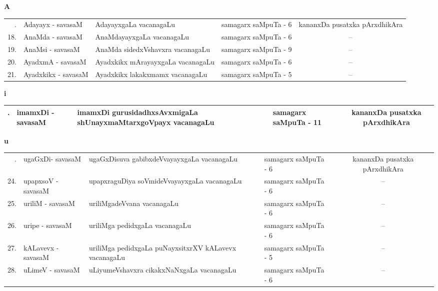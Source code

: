 \centerline{\bf A}

\medskip

{\renewcommand{\arraystretch}{1.35}
\begin{longtable}{rl>{\raggedright}p{5.5cm}lc}
\hline
\endfirsthead
\hline
\endhead
\hline
\endfoot
\endlastfoot
17. & Adayayx - savasaM & AdayayxgaLa vacanagaLu & samagarx saMpuTa - 6 & kananxDa pusatxka pArxdhikAra\\
18. & AnaMda - savasaM & AnaMdayayxgaLa vacanagaLu & samagarx saMpuTa - 6 & --\\
19. & AnaMsi - savasaM & AnaMda sidedxVshavxra vacanagaLu & samagarx saMpuTa - 9 & --\\
20. & AyadxmA - savasaM & Ayadxkikx mArayayxgaLa vacanagaLu & samagarx saMpuTa - 6 & --\\
21. & Ayadxkikx - savasaM & Ayadxkikx lakakxmamx vacanagaLu & samagarx saMpuTa - 5 & --\\
\hline
\end{longtable}}

\centerline{\bf i}

{\renewcommand{\arraystretch}{1.35}
\begin{longtable}{rl>{\raggedright}p{5.5cm}lc}
\hline
\endfirsthead
\hline
\endhead
\hline
\endfoot
\endlastfoot
22. & imamxDi - savasaM & imamxDi gurusidadhxsAvxmigaLa shUnayxmaMtarxgoVpayx vacanagaLu & samagarx saMpuTa - 11 & kananxDa pusatxka pArxdhikAra\\
\hline
\end{longtable}}


\bigskip

\centerline{\bf u}

\medskip

{\renewcommand{\arraystretch}{1.35}
\begin{longtable}{rl>{\raggedright}p{5.5cm}lc}
\hline
\endfirsthead
\hline
\endhead
\hline
\endfoot
\endlastfoot
23. &  ugaGxDi- savasaM & ugaGxDisuva gabibxdeVvayayxgaLa vacanagaLu & samagarx saMpuTa - 6  & kananxDa pusatxka pArxdhikAra\\
24. &  upapxsoV - savasaM & upapxraguDiya soVmideVvayayxgaLa vacanagaLu & samagarx saMpuTa - 6 & --\\
25. &  uriliM - savasaM & uriliMgadeVvana vacanagaLu & samagarx saMpuTa - 6 & --\\
26. &  uripe - savasaM & uriliMga pedidxgaLa vacanagaLu & samagarx saMpuTa - 6 & --\\
27. &  kALavevx - savasaM & uriliMga pedidxgaLa puNayxsitxrXV kALavevx vacanagaLu & samagarx saMpuTa - 5 & --\\
28. &  uLimeV - savasaM & uLiyumeVshavxra cikakxNaNxgaLa vacanagaLu & samagarx saMpuTa - 6  & --\\
\hline
\end{longtable}}
\bigskip

